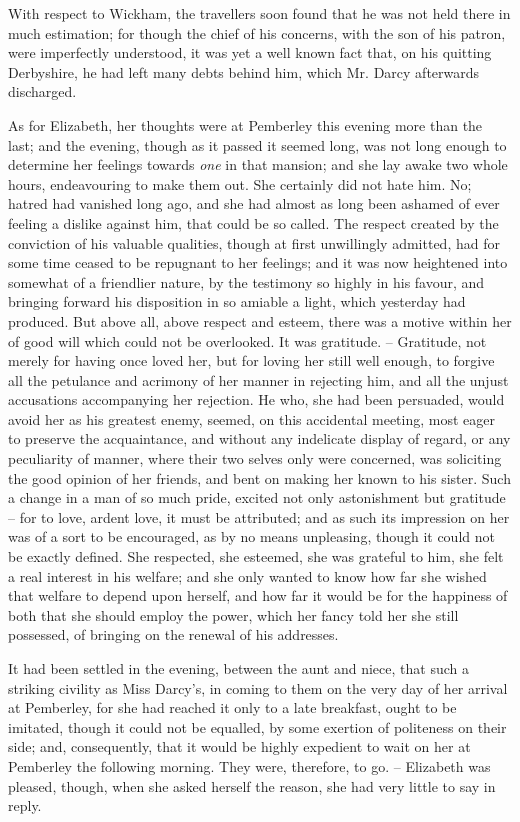 With respect to Wickham, the travellers soon found that
he was not held there in much estimation; for though
the chief of his concerns, with the son of his patron, were
imperfectly understood, it was yet a well known fact that,
on his quitting Derbyshire, he had left many debts behind
him, which Mr. Darcy afterwards discharged.

As for Elizabeth, her thoughts were at Pemberley this
evening more than the last; and the evening, though as
it passed it seemed long, was not long enough to determine
her feelings towards \textit{one} in that mansion; and she
lay awake two whole hours, endeavouring to make them
out. She certainly did not hate him. No; hatred had
vanished long ago, and she had almost as long been
ashamed of ever feeling a dislike against him, that could
be so called. The respect created by the conviction of
his valuable qualities, though at first unwillingly admitted,
had for some time ceased to be repugnant to her feelings;
and it was now heightened into somewhat of a friendlier
nature, by the testimony so highly in his favour, and
bringing forward his disposition in so amiable a light,
which yesterday had produced. But above all, above
respect and esteem, there was a motive within her of
good will which could not be overlooked. It was
gratitude. -- Gratitude, not merely for having once loved her,
but for loving her still well enough, to forgive all the
petulance and acrimony of her manner in rejecting him,
and all the unjust accusations accompanying her rejection.
He who, she had been persuaded, would avoid her as his
greatest enemy, seemed, on this accidental meeting, most
eager to preserve the acquaintance, and without any indelicate
display of regard, or any peculiarity of manner,
where their two selves only were concerned, was soliciting
the good opinion of her friends, and bent on making her
known to his sister. Such a change in a man of so much
pride, excited not only astonishment but gratitude -- for
to love, ardent love, it must be attributed; and as such
its impression on her was of a sort to be encouraged, as
by no means unpleasing, though it could not be exactly
defined. She respected, she esteemed, she was grateful
to him, she felt a real interest in his welfare; and she
only wanted to know how far she wished that welfare to
depend upon herself, and how far it would be for the
happiness of both that she should employ the power,
which her fancy told her she still possessed, of bringing
on the renewal of his addresses.

It had been settled in the evening, between the aunt
and niece, that such a striking civility as Miss Darcy’s,
in coming to them on the very day of her arrival at
Pemberley, for she had reached it only to a late breakfast,
ought to be imitated, though it could not be equalled,
by some exertion of politeness on their side; and, consequently,
that it would be highly expedient to wait on
her at Pemberley the following morning. They were,
therefore, to go. -- Elizabeth was pleased, though, when she
asked herself the reason, she had very little to say in reply.

